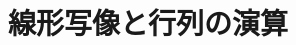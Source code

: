 \documentclass[../../topic_linear-algebra]{subfiles}
\begin{document}
\chapter{線形写像と行列の演算}





\end{document}
